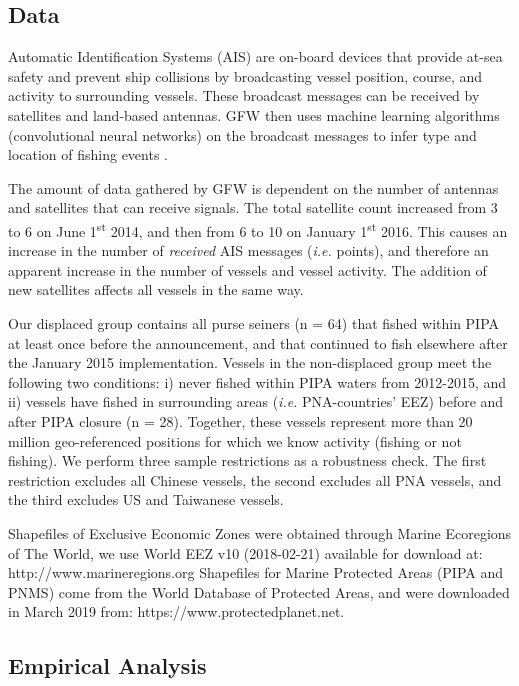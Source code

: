 \documentclass[12pt]{article}
\begin{document}
\subsection{Data}

Automatic Identification Systems (AIS) are on-board devices that provide at-sea safety and prevent ship collisions by broadcasting vessel position, course, and activity to surrounding vessels. These broadcast messages can be received by satellites and land-based antennas. GFW then uses machine learning algorithms (convolutional neural networks) on the broadcast messages to infer type and location of fishing events \cite{kroodsma_2018}.

The amount of data gathered by GFW is dependent on the number of antennas and satellites that can receive signals. The total satellite count increased from 3 to 6 on June 1\textsuperscript{st} 2014, and then from 6 to 10 on January 1\textsuperscript{st} 2016. This causes an increase in the number of \emph{received} AIS messages (\emph{i.e.} points), and therefore an apparent increase in the number of vessels and vessel activity. The addition of new satellites affects all vessels in the same way.

Our displaced group contains all purse seiners (n = 64) that fished within PIPA at least once before the announcement, and that continued to fish elsewhere after the January 2015 implementation. Vessels in the non-displaced group meet the following two conditions: i) never fished within PIPA waters from 2012-2015, and ii) vessels have fished in surrounding areas (\emph{i.e.} PNA-countries' EEZ) before and after PIPA closure (n = 28). Together, these vessels represent more than 20 million geo-referenced positions for which we know activity (fishing or not fishing). We perform three sample restrictions as a robustness check. The first restriction excludes all Chinese vessels, the second excludes all PNA vessels, and the third excludes US and Taiwanese vessels.

Shapefiles of Exclusive Economic Zones were obtained through Marine Ecoregions of The World, we use World EEZ v10 (2018-02-21) available for download at: http://www.marineregions.org Shapefiles for Marine Protected Areas (PIPA and PNMS) come from the World Database of Protected Areas, and were downloaded in March 2019 from: https://www.protectedplanet.net.

\subsection{Empirical Analysis}
\end{document}
